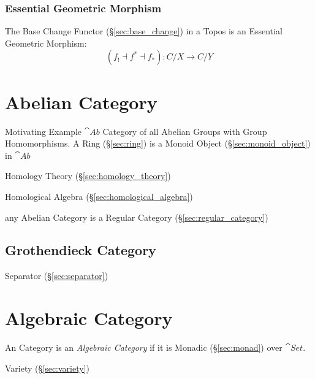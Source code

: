 \subsubsection{Essential Geometric Morphism}
\label{sec:essential_geometric}

The Base Change Functor (\S\ref{sec:base_change}) in a Topos is an
Essential Geometric Morphism:
\[
  (f_! \dashv f^* \dashv f_*):C/X \rightarrow C/Y
\]



\section{Abelian Category}\label{sec:abelian_category}

Motivating Example $\cat{Ab}$ Category of all Abelian Groups with
Group Homomorphisms. A Ring (\S\ref{sec:ring}) is a Monoid Object
(\S\ref{sec:monoid_object}) in $\cat{Ab}$

Homology Theory (\S\ref{sec:homology_theory})

Homological Algebra (\S\ref{sec:homological_algebra})

any Abelian Category is a Regular Category
(\S\ref{sec:regular_category})



\subsection{Grothendieck Category}\label{sec:grothendieck_category}

Separator (\S\ref{sec:separator})



\section{Algebraic Category}\label{sec:algebraic_category}

An Category is an \emph{Algebraic Category} if it is Monadic
(\S\ref{sec:monad}) over $\cat{Set}$.

Variety (\S\ref{sec:variety})



